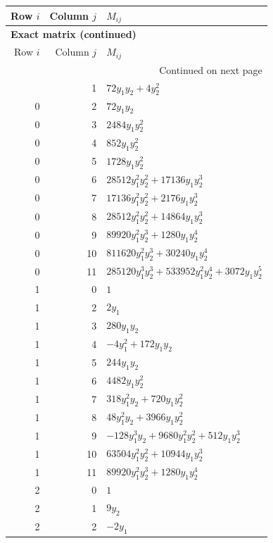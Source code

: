 \documentclass[10pt,a4paper]{article}
\begin{document}
{\small\setlength{\tabcolsep}{7pt}\begin{longtable}{rrp{125mm}}
\toprule Row $i$ & Column $j$ & $M_{ij}$\\\midrule\endfirsthead
\multicolumn{3}{l}{\textbf{Exact matrix (continued)}}\\
\toprule Row $i$ & Column $j$ & $M_{ij}$\\\midrule\endhead
\midrule\multicolumn{3}{r}{Continued on next page}\\\endfoot\bottomrule\endlastfoot
0 & 1 & $72 y_{1} y_{2} + 4 y_{2}^{2}$\\
0 & 2 & $72 y_{1} y_{2}$\\
0 & 3 & $2484 y_{1} y_{2}^{2}$\\
0 & 4 & $852 y_{1} y_{2}^{2}$\\
0 & 5 & $1728 y_{1} y_{2}^{2}$\\
0 & 6 & $28512 y_{1}^{2} y_{2}^{2} + 17136 y_{1} y_{2}^{3}$\\
0 & 7 & $17136 y_{1}^{2} y_{2}^{2} + 2176 y_{1} y_{2}^{3}$\\
0 & 8 & $28512 y_{1}^{2} y_{2}^{2} + 14864 y_{1} y_{2}^{3}$\\
0 & 9 & $89920 y_{1}^{2} y_{2}^{3} + 1280 y_{1} y_{2}^{4}$\\
0 & 10 & $811620 y_{1}^{2} y_{2}^{3} + 30240 y_{1} y_{2}^{4}$\\
0 & 11 & $285120 y_{1}^{3} y_{2}^{3} + 533952 y_{1}^{2} y_{2}^{4} + 3072 y_{1} y_{2}^{5}$\\
1 & 0 & $1$\\
1 & 2 & $2 y_{1}$\\
1 & 3 & $280 y_{1} y_{2}$\\
1 & 4 & $- 4 y_{1}^{2} + 172 y_{1} y_{2}$\\
1 & 5 & $244 y_{1} y_{2}$\\
1 & 6 & $4482 y_{1} y_{2}^{2}$\\
1 & 7 & $318 y_{1}^{2} y_{2} + 720 y_{1} y_{2}^{2}$\\
1 & 8 & $48 y_{1}^{2} y_{2} + 3966 y_{1} y_{2}^{2}$\\
1 & 9 & $- 128 y_{1}^{3} y_{2} + 9680 y_{1}^{2} y_{2}^{2} + 512 y_{1} y_{2}^{3}$\\
1 & 10 & $63504 y_{1}^{2} y_{2}^{2} + 10944 y_{1} y_{2}^{3}$\\
1 & 11 & $89920 y_{1}^{2} y_{2}^{3} + 1280 y_{1} y_{2}^{4}$\\
2 & 0 & $1$\\
2 & 1 & $9 y_{2}$\\
2 & 2 & $- 2 y_{1}$\\

\end{longtable}}
\end{document}
